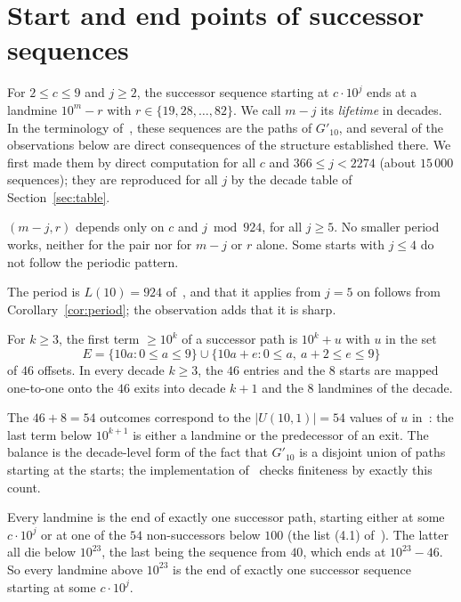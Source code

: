 \section{Start and end points of successor sequences}
\label{sec:ends}

For $2 \le c \le 9$ and $j \ge 2$, the successor sequence starting at $c \cdot 10^j$ ends at a
landmine $10^m - r$ with $r \in \{19, 28, \dots, 82\}$. We call $m - j$ its \emph{lifetime} in
decades. In the terminology of~\cite{dbts}, these sequences are the paths of $G'_{10}$, and several
of the observations below are direct consequences of the structure established there. We first made
them by direct computation for all $c$ and $366 \le j < 2274$ (about $15\,000$ sequences); they are
reproduced for all $j$ by the decade table of Section~\ref{sec:table}.

\begin{observation}[Periodicity]
  \label{obs:periodic}
  $(m - j, r)$ depends only on $c$ and $j \bmod 924$, for all $j \ge 5$. No smaller period works,
  neither for the pair nor for $m - j$ or $r$ alone. Some starts with $j \le 4$ do not follow the
  periodic pattern.
\end{observation}

The period is $L(10) = 924$ of~\cite[Proposition~8]{dbts}, and that it applies from $j = 5$ on
follows from Corollary~\ref{cor:period}; the observation adds that it is sharp.

\begin{observation}
  \label{obs:balance}
  For $k \ge 3$, the first term $\ge 10^k$ of a successor path is $10^k + u$ with $u$ in the set
  \[
    E = \{10a : 0 \le a \le 9\} \cup \{10a + e : 0 \le a,\ a + 2 \le e \le 9\}
  \]
  of $46$ offsets. In every decade $k \ge 3$, the $46$ entries and the $8$ starts are mapped
  one-to-one onto the $46$ exits into decade $k + 1$ and the $8$ landmines of the decade.
\end{observation}

The $46 + 8 = 54$ outcomes correspond to the $|U(10, 1)| = 54$ values of $u$ in~\cite{dbts}: the
last term below $10^{k+1}$ is either a landmine or the predecessor of an exit. The balance is the
decade-level form of the fact that $G'_{10}$ is a disjoint union of paths starting at the starts;
the implementation of~\cite{dbts} checks finiteness by exactly this count.

Every landmine is the end of exactly one successor path, starting either at some $c \cdot 10^j$ or
at one of the $54$ non-successors below $100$ (the list (4.1) of~\cite{comma}). The latter all die
below $10^{23}$, the last being the sequence from $40$, which ends at $10^{23} - 46$. So every
landmine above $10^{23}$ is the end of exactly one successor sequence starting at some
$c \cdot 10^j$.

